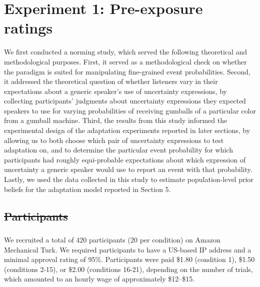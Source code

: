 \documentclass[man, floatsintext]{apa6}
\providecommand{\DIFadd}[1]{{\protect\color{blue}\uwave{#1}}} %
\providecommand{\DIFdel}[1]{{\protect\color{red}\sout{#1}}}                      %
\providecommand{\DIFaddbegin}{} %
\providecommand{\DIFaddend}{} %
\providecommand{\DIFdelbegin}{} %
\providecommand{\DIFdelend}{} %
\newcommand{\DIFscaledelfig}{0.5}
\newlength{\DIFdelgraphicswidth} %
\newlength{\DIFdelgraphicsheight} %
\newcommand{\DIFaddincludegraphics}[2][]{{\color{blue}\fbox{\DIFOincludegraphics[#1]{#2}}}} %
\newcommand{\DIFdelincludegraphics}[2][]{%
\sbox{\DIFdelgraphicsbox}{\DIFOincludegraphics[#1]{#2}}%
\settoboxwidth{\DIFdelgraphicswidth}{\DIFdelgraphicsbox} %
\settoboxtotalheight{\DIFdelgraphicsheight}{\DIFdelgraphicsbox} %
\scalebox{\DIFscaledelfig}{%
\parbox[b]{\DIFdelgraphicswidth}{\usebox{\DIFdelgraphicsbox}\\[-\baselineskip] \rule{\DIFdelgraphicswidth}{0em}}\llap{\resizebox{\DIFdelgraphicswidth}{\DIFdelgraphicsheight}{%
\setlength{\unitlength}{\DIFdelgraphicswidth}%
\begin{picture}(1,1)%
\thicklines\linethickness{2pt} %
{\color[rgb]{1,0,0}\put(0,0){\framebox(1,1){}}}%
{\color[rgb]{1,0,0}\put(0,0){\line( 1,1){1}}}%
{\color[rgb]{1,0,0}\put(0,1){\line(1,-1){1}}}%
\end{picture}%
}\hspace*{3pt}}} %
} %
\DeclareRobustCommand{\DIFaddbegin}{\DIFOaddbegin \let\includegraphics\DIFaddincludegraphics} %
\DeclareRobustCommand{\DIFaddend}{\DIFOaddend \let\includegraphics\DIFOincludegraphics} %
\DeclareRobustCommand{\DIFdelbegin}{\DIFOdelbegin \let\includegraphics\DIFdelincludegraphics} %
\DeclareRobustCommand{\DIFdelend}{\DIFOaddend \let\includegraphics\DIFOincludegraphics} %
\begin{document}
\section{Experiment 1: Pre-exposure ratings}
\label{sec:exp-norming}

We first conducted a norming study, which served the following theoretical and methodological purposes.
First, it served as a methodological check on whether the paradigm is suited for 
manipulating fine-grained event probabilities. 
Second, it addressed the theoretical question of whether listeners vary in their expectations about
a generic speaker's use of uncertainty expressions, by collecting participants' judgments about 
uncertainty expressions they expected speakers to use for varying probabilities of receiving gumballs of a particular color from a gumball machine. 
Third,  the results from this study informed the experimental design of the adaptation experiments 
reported in later sections, by allowing us to both choose which pair of uncertainty expressions to test adaptation on, 
and to determine the particular event probability for which participants had roughly equi-probable expectations 
about which expression of uncertainty a generic speaker would use to report an event with that probability. 
Lastly, we used the data collected in this study to 
estimate population-level prior beliefs for the adaptation model reported in Section 5.

\subsection{\DIFdelbegin \DIFdel{Participants}\DIFdelend \DIFaddbegin \DIFadd{Method}\DIFaddend }
\DIFaddbegin 

\subsubsection{\DIFadd{Participants}}
\DIFaddend We recruited a total of 420 participants 
(20 per condition) on Amazon Mechanical Turk. 
We required participants to have a US-based IP address and a minimal approval rating of 95\%.
Participants were paid \$1.80 (condition 1), \$1.50 (conditions 2-15),
or \$2.00 (conditions 16-21),
depending on the number of trials,
which amounted to an hourly wage of approximately \$12--\$15. 
\end{document}
